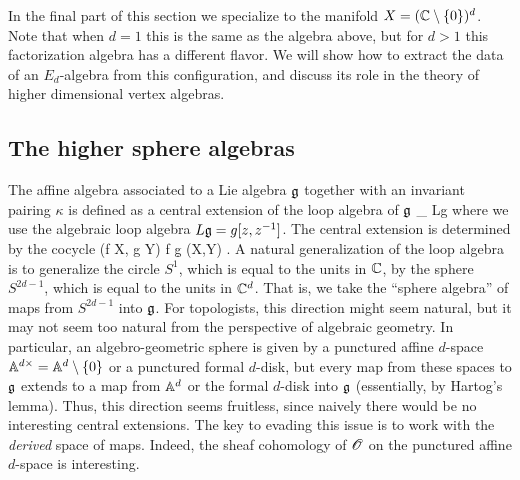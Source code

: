 In the final part of this section we specialize to the manifold $X = (\CC \setminus \{0\})^d$. 
Note that when $d=1$ this is the same as the algebra above, but for $d>1$ this factorization algebra has a different flavor. 
We will show how to extract the data of an $E_d$-algebra from this configuration, and discuss its role in the theory of higher dimensional vertex algebras. 



\subsection{The higher sphere algebras}

The affine algebra associated to a Lie algebra $\fg$ together with an invariant pairing $\kappa$ is defined as a central extension of the loop algebra of $\fg$
\ben
\CC \to \Hat{\fg}_{\kappa} \to Lg 
\een
where we use the algebraic loop algebra $L\fg = g [z,z^{-1}]$.
The central extension is determined by the cocycle 
\ben
(f \tensor X, g \tensor Y) \mapsto \oint f \d g \kappa(X,Y) .
\een 
A natural generalization of the loop algebra is to generalize the circle $S^1$, which is equal to the units in $\CC$, by the sphere $S^{2d-1}$, which is equal to the units in $\CC^d$.
That is, we take the ``sphere algebra'' of maps from $S^{2d-1}$ into $\fg$.
For topologists, this direction might seem natural,
but it may not seem too natural from the perspective of algebraic geometry.
In particular, an algebro-geometric sphere is given by a punctured affine $d$-space $\AA^{d\times} = \AA^d \setminus \{0\}$ or a punctured formal $d$-disk,
but every map from these spaces to $\fg$ extends to a map from $\AA^d$ or the formal $d$-disk into $\fg$ (essentially, by Hartog's lemma).
Thus, this direction seems fruitless, since naively there would be no interesting central extensions.
The key to evading this issue is to work with the {\em derived} space of maps. 
Indeed, the sheaf cohomology of $\sO$ on the punctured affine $d$-space is interesting. 

